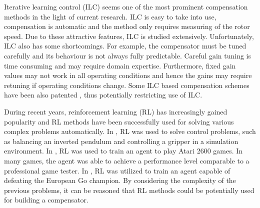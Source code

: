 Iterative learning control (ILC) seems one of the most prominent compensation methods in the light of current research. ILC is easy to take into use, compensation is automatic and the method only requires measuring of the rotor speed. Due to these attractive features, ILC is studied extensively. Unfortunately, ILC also has some shortcomings. For example, the compensator must be tuned carefully and its behaviour is not always fully predictable. Careful gain tuning is time consuming and may require domain expertise. Furthermore, fixed gain values may not work in all operating conditions and hence the gains may require retuning if operating conditions change. Some ILC based compensation schemes have been also patented \cite{ILC:patent, ILC:patent2}, thus potentially restricting use of ILC. 




During recent years, reinforcement learning (RL) has increasingly gained popularity and RL methods have been successfully used for solving various complex problems automatically. In \cite{RL:control, RL:control2}, RL was used to solve control problems, such as balancing an inverted pendulum and controlling a gripper in a simulation environment. In \cite{RL:atari}, RL was used to train an agent to play Atari 2600 games. In many games, the agent was able to achieve a performance level comparable to a professional game tester. In \cite{RL:alphago}, RL was utilized to train an agent capable of defeating the European Go champion. By considering the complexity of the previous problems, it can be reasoned that RL methods could be potentially used for building a compensator.

